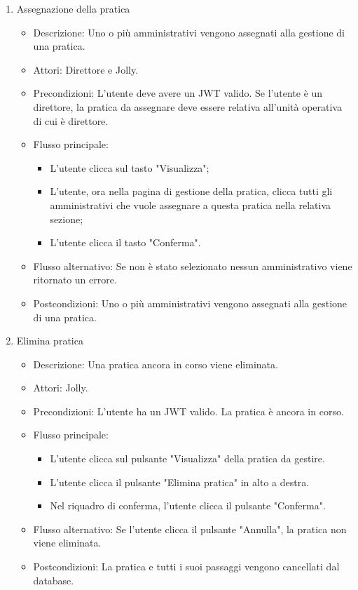 \documentclass{article}
\begin{document}
\begin{enumerate}
    \item Assegnazione della pratica 
    \begin{itemize}
        \item Descrizione: Uno o più amministrativi vengono assegnati alla gestione di una pratica.
        \item Attori: Direttore e Jolly.
        \item Precondizioni: L'utente deve avere un JWT valido. Se l'utente è un direttore, la pratica da assegnare deve essere relativa all'unità operativa di cui è direttore.
        \item Flusso principale: \begin{itemize}
            \item L'utente clicca sul tasto "Visualizza";
            \item L'utente, ora nella pagina di gestione della pratica, clicca tutti gli amministrativi che vuole assegnare a questa pratica nella relativa sezione;
            \item L'utente clicca il tasto "Conferma".
        \end{itemize}
        \item Flusso alternativo: Se non è stato selezionato nessun amministrativo viene ritornato un errore.
        \item Postcondizioni: Uno o più amministrativi vengono assegnati alla gestione di una pratica.
    \end{itemize}

    \item Elimina pratica 
    \begin{itemize}
        \item Descrizione: Una pratica ancora in corso viene eliminata.
        \item Attori: Jolly.
        \item Precondizioni: L'utente ha un JWT valido. La pratica è ancora in corso. 
        \item Flusso principale: \begin{itemize}
            \item L'utente clicca sul pulsante "Visualizza" della pratica da gestire. 
            \item L'utente clicca il pulsante "Elimina pratica" in alto a destra. 
            \item Nel riquadro di conferma, l'utente clicca il pulsante "Conferma".
        \end{itemize}
        \item Flusso alternativo: Se l'utente clicca il pulsante "Annulla", la pratica non viene eliminata.
        \item Postcondizioni: La pratica e tutti i suoi passaggi vengono cancellati dal database.
    \end{itemize}


\end{enumerate}
\end{document}
